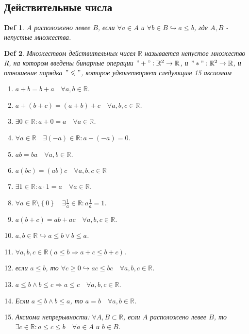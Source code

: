 \documentclass[a5paper, 10pt]{article}
\theoremstyle{plain}
\newtheorem*{definition_}{Def}
\newcommand{\R}{\mathbb R}
\newcommand{\rarrow}{\Rightarrow}
\newcommand{\hrarrow}{\hookrightarrow}
\begin{document}
	\subsection{Действительные числа}

	\begin{definition_}
	$ A $ расположено левее $ B $, если $ \forall a \in A $ и
	$ \forall b \in B \hrarrow a \leqslant b $, где $ A, B $ - непустые множества.
	\end{definition_}

	\begin{definition_}
	Множеством действительных чисел $ \R $ называется непустое множество \R,
	на котором введены бинарные операции $ "+": \R^2 \rightarrow \R $, и
	$ "*": \R^2 \rightarrow \R $, и отношение порядка $ "\leqslant" $, которое удволетворяет
	следующим 15 аксиомам

		\begin{enumerate}
			\item $ a + b = b + a \quad \forall a, b \in \R $.
			\item $ a + (b + c) = (a + b) + c \quad \forall a, b, c \in \R $.
			\item $ \exists 0 \in \R: a + 0 = a \quad \forall a \in \R $.
			\item $ \forall a \in \R \quad \exists (-a) \in \R: a + (-a) = 0 $.

			\item $ ab = ba \quad \forall a, b \in \R $.
			\item $ a(bc) = (ab)c \quad \forall a, b, c \in \R $
			\item $ \exists 1 \in \R: a \cdot 1 = a \quad \forall a \in \R $.
			\item $ \forall a \in \R \setminus \left\{0\right\}
				\quad \exists \frac{1}{a} \in \R: a\frac{1}{a} = 1 $.

			\item $ a(b+c) = ab + ac \quad \forall a, b, c \in \R $.

			\item $ a, b \in \R \hrarrow a \leqslant b \lor b \leqslant a $.
			\item $ \forall a, b, c \in \R
				\left( a \leqslant b \rarrow a + c \leqslant b + c \right) $.
			\item если $ a \leqslant b $, то
				$ \forall c \geqslant 0 \hrarrow ac \leqslant bc \quad \forall a, b, c \in \R $.
			\item $ a \leqslant b \land b \leqslant c \rarrow a \leqslant c
				\quad \forall a, b, c \in \R $.
			\item Если $ a \leqslant b \land b \leqslant a $, то $ a = b \quad \forall a, b \in \R $.

			\item Аксиома непрерывности:
				$ \forall A, B \subset \R $, если $ A $ расположено левее $ B $, то
				$ \exists c \in \R: a \leqslant c \leqslant b \quad \forall a \in A $ и $ b \in B $.
		\end{enumerate}

	\end{definition_}
\end{document}
